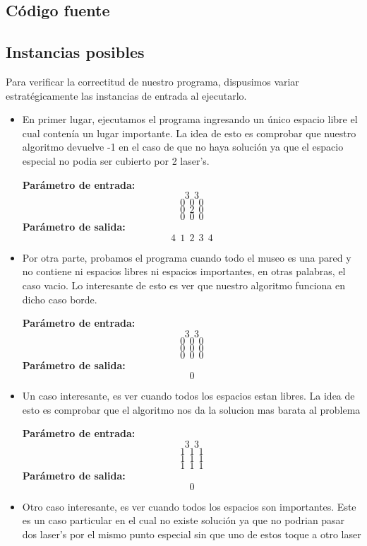 \subsection{Código fuente}

\subsection{Instancias posibles}
Para verificar la correctitud de nuestro programa, dispusimos variar estratégicamente las instancias de entrada al ejecutarlo.
\begin{itemize}
\item En primer lugar, ejecutamos el programa ingresando un único espacio libre el cual contenía un lugar importante. La idea de esto es comprobar que nuestro algoritmo devuelve -1 en el caso de que no haya solución ya que el espacio especial no podia ser cubierto por 2 laser's.\newline

\textbf{Parámetro de entrada:} 
$$3\ \ 3$$
$$0\ \ 0\ \ 0$$
$$0\ \ 2\ \ 0$$
$$0\ \ 0\ \ 0$$
\textbf{Parámetro de salida:} $$4\ \ 1\ \ 2\ \ 3\ \ 4$$\newline
\item Por otra parte, probamos el programa cuando todo el museo es una pared y no contiene ni espacios libres ni espacios importantes, en otras palabras, el caso vacio. Lo interesante de esto es ver que nuestro algoritmo funciona en dicho caso borde.\newline

\textbf{Parámetro de entrada:} 
$$3\ \ 3$$
$$0\ \ 0\ \ 0$$
$$0\ \ 0\ \ 0$$
$$0\ \ 0\ \ 0$$
\textbf{Parámetro de salida:} $$ 0 $$\newline
\item Un caso interesante, es ver cuando todos los espacios estan libres. La idea de esto es comprobar que el algoritmo nos da la solucion mas barata al problema\newline

\textbf{Parámetro de entrada:} 
$$3\ \ 3$$
$$1\ \ 1\ \ 1$$
$$1\ \ 1\ \ 1$$
$$1\ \ 1\ \ 1$$
\textbf{Parámetro de salida:} $$ 0 $$\newline

\item Otro caso interesante, es ver cuando todos los espacios son importantes. Este es un caso particular en el cual no existe solución ya que no podrian pasar dos laser's por el mismo punto especial sin que uno de estos toque a otro laser\newline


\end{itemize}

